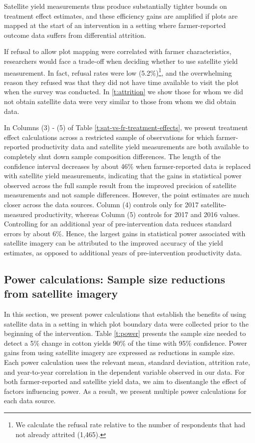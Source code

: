 \documentclass{article}
\begin{document}
Satellite yield measurements thus produce substantially tighter bounds on treatment effect estimates, and these efficiency gains are amplified if plots are mapped at the start of an intervention in a setting where farmer-reported outcome data suffers from differential attrition. 

If refusal to allow plot mapping were correlated with farmer characteristics, researchers would face a trade-off when deciding whether to use satellite yield measurement. In fact, refusal rates were low (5.2\%)\footnote{We calculate the refusal rate relative to the number of respondents that had not already attrited (1,465).}, and the overwhelming reason they refused was that they did not have time available to visit the plot when the survey was conducted. In \ref{t:attrition} we show those for whom we did not obtain satellite data were very similar to those from whom we did obtain data. 

In Columns (3) - (5) of Table \ref{t:sat-vs-fr-treatment-effects}, we present treatment effect calculations across a restricted sample of observations for which farmer-reported productivity data and satellite yield measurements are both available to completely shut down sample composition differences. The length of the confidence interval decreases by about 46\% when farmer-reported data is replaced with satellite yield measurements, indicating that the gains in statistical power observed across the full sample result from the improved precision of satellite measurements and not sample differences. However, the point estimates are much closer across the data sources. Column (4) controls only for 2017 satellite-measured productivity, whereas Column (5) controls for 2017 and 2016 values. Controlling for an additional year of pre-intervention data reduces standard errors by about 6\%. Hence, the largest gains in statistical power associated with satellite imagery can be attributed to the improved accuracy of the yield estimates, as opposed to additional years of pre-intervention productivity data.

\subsection{Power calculations: Sample size reductions from satellite imagery} \label{section:power}

In this section, we present power calculations that establish the benefits of using satellite data in a setting in which plot boundary data were collected prior to the beginning of the intervention. Table \ref{t:power} presents the sample size needed to detect a 5\% change in cotton yields 90\% of the time with 95\% confidence. Power gains from using satellite imagery are expressed as reductions in sample size. Each power calculation uses the relevant mean, standard deviation, attrition rate, and year-to-year correlation in the dependent variable observed in our data. For both farmer-reported and satellite yield data, we aim to disentangle the effect of factors influencing power. As a result, we present multiple power calculations for each data source. 
\end{document}
